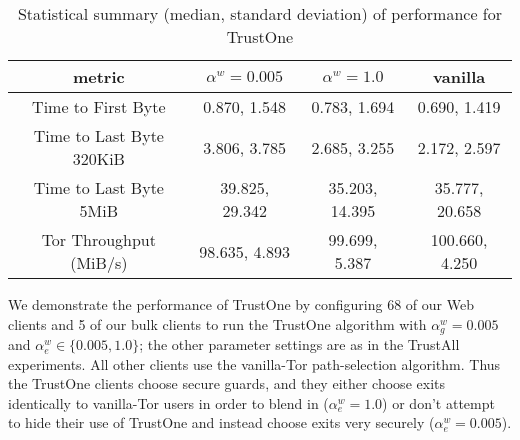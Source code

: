 \documentclass[conference]{styles/IEEEtran}
\begin{document}
\begin{table}
\begin{center}
\begin{tabular}{|c||c|c|c|}\hline
metric & $\alpha^w=0.005$ & $\alpha^w=1.0$ & vanilla \\ \hline
\hline
Time to First Byte       & 0.870, 1.548   & 0.783, 1.694   & 0.690, 1.419 \\ \hline
Time to Last Byte 320KiB & 3.806, 3.785   & 2.685, 3.255   & 2.172, 2.597 \\ \hline
Time to Last Byte 5MiB   & 39.825, 29.342 & 35.203, 14.395 & 35.777, 20.658 \\ \hline
Tor Throughput (MiB/s)   & 98.635, 4.893  & 99.699, 5.387  & 100.660, 4.250 \\ \hline
\end{tabular}
\end{center}
\caption{\small Statistical summary (median, standard deviation) of performance for TrustOne}\label{tab:perf-trust-one}
\vspace{-4mm}
\end{table}

We demonstrate the performance of TrustOne by configuring 68 of our Web clients
and 5 of our bulk clients to run the
TrustOne algorithm with $\alpha^w_g = 0.005$ and
$\alpha^w_e\in \{0.005,1.0\}$; the other parameter settings are as in the
TrustAll experiments. All other clients use the vanilla-Tor path-selection
algorithm. Thus the TrustOne clients choose secure guards, and they either choose exits
identically to vanilla-Tor users in order to blend in ($\alpha^w_e=1.0$)
or don't attempt to hide their use of TrustOne and instead choose exits very securely
($\alpha^w_e=0.005$).
\end{document}
